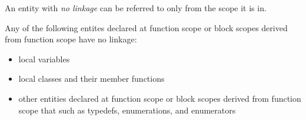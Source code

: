 
\p An entity with \textit{no linkage} can be referred to only from the scope it is in.

\p Any of the following entites declared at function scope or block scopes derived from function scope have no linkage:
\begin{itemize}
  \item local variables
  \item local classes and their member functions
  \item other entities declared at function scope or block scopes derived from function scope that such as typedefs, enumerations, and enumerators
\end{itemize}
